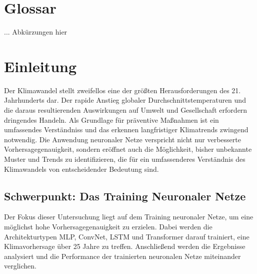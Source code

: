 \documentclass[manuscript,screen,review]{acmart} %
\begin{document}



\maketitle

\section{Glossar}
... Abkürzungen hier




\section{Einleitung}
Der Klimawandel stellt zweifellos eine der größten Herausforderungen des 21. Jahrhunderts dar. Der rapide Anstieg globaler Durchschnittstemperaturen und die daraus resultierenden Auswirkungen auf Umwelt und Gesellschaft erfordern dringendes Handeln. Als Grundlage für präventive Maßnahmen ist ein umfassendes Verständniss und das erkennen langfristiger Klimatrends zwingend notwendig. 
Die Anwendung neuronaler Netze verspricht nicht nur verbesserte Vorhersagegenauigkeit, sondern eröffnet auch die Möglichkeit, bisher unbekannte Muster und Trends zu identifizieren, die für ein umfassenderes Verständnis des Klimawandels von entscheidender Bedeutung sind.

\subsection{Schwerpunkt: Das Training Neuronaler Netze}
Der Fokus dieser Untersuchung liegt auf dem Training neuronaler Netze, um eine möglichst hohe Vorhersagegenauigkeit zu erzielen. Dabei werden die Architekturtypen MLP, ConvNet, LSTM und Transformer darauf trainiert, eine Klimavorhersage über 25 Jahre zu treffen. Anschließend werden die Ergebnisse analysiert und die Performance der trainierten neuronalen Netze miteinander verglichen. 
\end{document}
